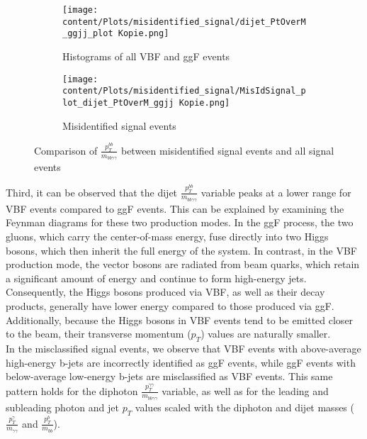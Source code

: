 \begin{figure}[htbp]
    \centering
    \begin{subfigure}{0.45\textwidth}
        \centering
        \texttt{[image: content/Plots/misidentified\_signal/dijet\_PtOverM\_ggjj\_plot Kopie.png]}
        \caption{Histograms of all VBF and ggF events}
        \label{fig:roc1}
    \end{subfigure}
    \hfill
    \begin{subfigure}{0.45\textwidth}
        \centering
        \texttt{[image: content/Plots/misidentified\_signal/MisIdSignal\_plot\_dijet\_PtOverM\_ggjj Kopie.png]}
        \caption{Misidentified signal events}
        \label{fig:roc2}
    \end{subfigure}
    \caption{Comparison of $\frac{p_T^{bb}}{m_{bb \gamma \gamma}}$ between misidentified signal events and all signal events}
    \label{fig:combined_roc}
\end{figure}


Third, it can be observed that the dijet $\frac{p_T^{bb}}{m_{bb \gamma \gamma}}$ variable peaks at a lower range for VBF events compared to ggF events.
This can be explained by examining the Feynman diagrams for these two production modes. In the ggF process, the two gluons, which carry the center-of-mass energy, fuse directly into two Higgs bosons,
which then inherit the full energy of the system. In contrast, in the VBF production mode, the vector bosons are radiated from beam quarks, which retain a significant amount of energy and continue to form
high-energy jets. Consequently, the Higgs bosons produced via VBF, as well as their decay products, generally have lower energy compared to those produced via ggF. Additionally, because the Higgs bosons in
VBF events tend to be emitted closer to the beam, their transverse momentum ($p_T$) values are naturally smaller. \\

In the misclassified signal events, we observe that VBF events with above-average high-energy b-jets are incorrectly identified as ggF events, while ggF events with below-average low-energy b-jets are
misclassified as VBF events. This same pattern holds for the diphoton $\frac{p_T^{\gamma \gamma}}{m_{bb \gamma \gamma}}$ variable, as well as for the leading and subleading photon and jet $p_T$ values scaled
with the diphoton and dijet masses ($\frac{p_T^{\gamma}}{m_{\gamma \gamma}}$ and $\frac{p_T^{b}}{m_{bb}}$). \\

